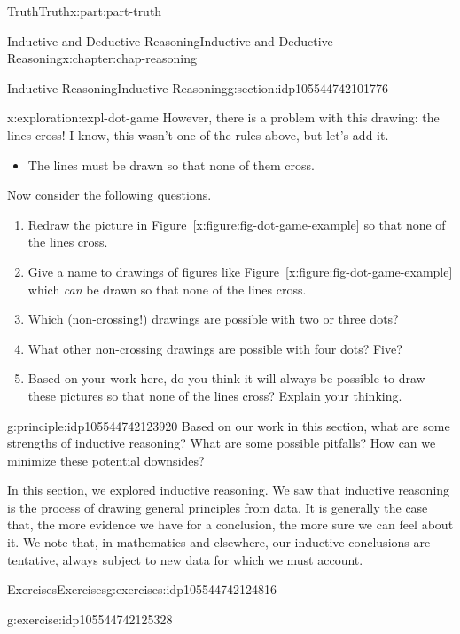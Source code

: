 \documentclass[oneside,10pt,]{book}
\newcommand{\xreffont}{\relax}
\numberwithin{equation}{section}
\begin{document}
\begin{partptx}{Truth}{}{Truth}{}{}{x:part:part-truth}
\begin{chapterptx}{Inductive and Deductive Reasoning}{}{Inductive and Deductive Reasoning}{}{}{x:chapter:chap-reasoning}
\begin{sectionptx}{Inductive Reasoning}{}{Inductive Reasoning}{}{}{g:section:idp105544742101776}
\begin{exploration}{}{x:exploration:expl-dot-game}
However, there is a problem with this drawing: the lines cross! I know, this wasn't one of the rules above, but let's add it.%
%
\begin{itemize}[label=\textbullet]
\item{}The lines must be drawn so that none of them cross.%
\end{itemize}
Now consider the following questions.%
%
\begin{enumerate}
\item{}Redraw the picture in \hyperref[x:figure:fig-dot-game-example]{Figure~{\xreffont\ref{x:figure:fig-dot-game-example}}} so that none of the lines cross.%
\item{}Give a name to drawings of figures like \hyperref[x:figure:fig-dot-game-example]{Figure~{\xreffont\ref{x:figure:fig-dot-game-example}}} which \emph{can} be drawn so that none of the lines cross.%
\item{}Which (non-crossing!) drawings are possible with two or three dots?%
\item{}What other non-crossing drawings are possible with four dots? Five?%
\item{}Based on your work here, do you think it will always be possible to draw these pictures so that none of the lines cross? Explain your thinking.%
\end{enumerate}
\end{exploration}%
\begin{principle}{}{}{g:principle:idp105544742123920}%
Based on our work in this section, what are some strengths of inductive reasoning? What are some possible pitfalls? How can we minimize these potential downsides?%
\end{principle}
\begin{conclusion}{}%
In this section, we explored inductive reasoning. We saw that inductive reasoning is the process of drawing general principles from data. It is generally the case that, the more evidence we have for a conclusion, the more sure we can feel about it. We note that, in mathematics and elsewhere, our inductive conclusions are tentative, always subject to new data for which we must account.%
\end{conclusion}%
%
%
\typeout{************************************************}
\typeout{************************************************}
%
\begin{exercises-subsection-numberless}{Exercises}{}{Exercises}{}{}{g:exercises:idp105544742124816}
\begin{divisionexercise}{1}{}{}{g:exercise:idp105544742125328}%

\end{divisionexercise}
\end{exercises-subsection-numberless}
\end{sectionptx}
\end{chapterptx}
\end{partptx}
\end{document}
